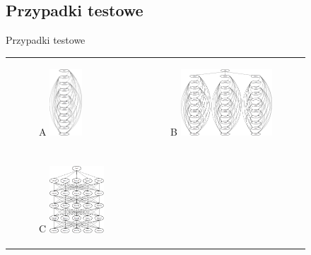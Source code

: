 \documentclass{beamer}
\begin{document}
\subsection*{Przypadki testowe}

\begin{frame}{Przypadki testowe}
\begin{table}
     \begin{small}
	\begin{tabular}{ p{4cm} p{6cm} }
	
	\begin{minipage}{.5\textwidth}
\begin{figure}[H]
	\begin{center}
	  	A
  		\includegraphics[height=2.5cm]{TestA.png}
	\end{center}
\end{figure}
   	 \end{minipage}
   	 &	
	\begin{minipage}{.5\textwidth}
\begin{figure}[H]
	\begin{center}
		B
  		\includegraphics[height=2.5cm]{TestB.png}
	\end{center}
\end{figure}
   	 \end{minipage}
   	 \\ \\
	\begin{minipage}{.5\textwidth}
\begin{figure}[H]
	\begin{center}
		C
  		\includegraphics[height=2.5cm]{TestC.png}
	\end{center}

\end{figure}
\end{minipage}
\end{tabular}
\end{small}
\end{table}
\end{frame}
\end{document}
